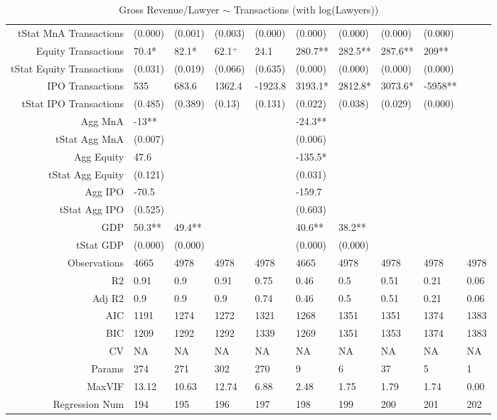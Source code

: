 \begin{table}[ht]
\begin{tabular}{rlllllllll}
  tStat MnA Transactions & (0.000) & (0.001) & (0.003) & (0.000) & (0.000) & (0.000) & (0.000) & (0.000) &  \\ 
  Equity Transactions & 70.4* & 82.1* & 62.1$^{+}$ & 24.1 & 280.7** & 282.5** & 287.6** & 209** &  \\ 
  tStat Equity Transactions & (0.031) & (0.019) & (0.066) & (0.635) & (0.000) & (0.000) & (0.000) & (0.000) &  \\ 
  IPO Transactions & 535 & 683.6 & 1362.4 & -1923.8 & 3193.1* & 2812.8* & 3073.6* & -5958** &  \\ 
  tStat IPO Transactions & (0.485) & (0.389) & (0.13) & (0.131) & (0.022) & (0.038) & (0.029) & (0.000) &  \\ 
  Agg MnA & -13** &  &  &  & -24.3** &  &  &  &  \\ 
  tStat Agg MnA & (0.007) &  &  &  & (0.006) &  &  &  &  \\ 
  Agg Equity & 47.6 &  &  &  & -135.5* &  &  &  &  \\ 
  tStat Agg Equity & (0.121) &  &  &  & (0.031) &  &  &  &  \\ 
  Agg IPO & -70.5 &  &  &  & -159.7 &  &  &  &  \\ 
  tStat Agg IPO & (0.525) &  &  &  & (0.603) &  &  &  &  \\ 
  GDP & 50.3** & 49.4** &  &  & 40.6** & 38.2** &  &  &  \\ 
  tStat GDP & (0.000) & (0.000) &  &  & (0.000) & (0.000) &  &  &  \\ 
  Observations & 4665 & 4978 & 4978 & 4978 & 4665 & 4978 & 4978 & 4978 & 4978 \\ 
  R2 & 0.91 & 0.9 & 0.91 & 0.75 & 0.46 & 0.5 & 0.51 & 0.21 & 0.06 \\ 
  Adj R2 & 0.9 & 0.9 & 0.9 & 0.74 & 0.46 & 0.5 & 0.51 & 0.21 & 0.06 \\ 
  AIC & 1191 & 1274 & 1272 & 1321 & 1268 & 1351 & 1351 & 1374 & 1383 \\ 
  BIC & 1209 & 1292 & 1292 & 1339 & 1269 & 1351 & 1353 & 1374 & 1383 \\ 
  CV & NA & NA & NA & NA & NA & NA & NA & NA & NA \\ 
  Params & 274 & 271 & 302 & 270 & 9 & 6 & 37 & 5 & 1 \\ 
  MaxVIF & 13.12 & 10.63 & 12.74 & 6.88 & 2.48 & 1.75 & 1.79 & 1.74 & 0.00 \\ 
  Regression Num & 194 & 195 & 196 & 197 & 198 & 199 & 200 & 201 & 202 \\ 
   \hline
\end{tabular}
\caption{Gross Revenue/Lawyer $\sim$ Transactions (with log(Lawyers))} 
\end{table}
